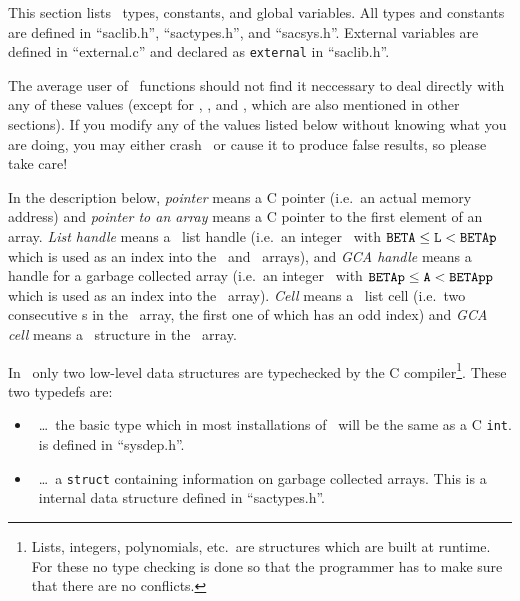 This section lists \saclib\ types, constants, and global variables. All
types and constants are defined in ``saclib.h'', ``sactypes.h'', and
``sacsys.h''. External variables are defined in ``external.c'' and declared
as {\tt external} in ``saclib.h''.

The average user of \saclib\ functions should not find it neccessary to deal
directly with any of these values (except for \Word, \BETA, and \NIL, which
are also mentioned in other sections). If you modify any of the values
listed below without knowing what you are doing, you may either crash
\saclib\ or cause it to produce false results, so please take care!

\medskip

In the description below, {\em pointer} means a C pointer (i.e.\ an actual
memory address) and {\em pointer to an array} means a C pointer to the
first element of an array. {\em List handle} means a \saclib\ list handle
(i.e.\ an integer \ttL\ with ${\tt BETA} \leq {\tt L} < {\tt BETAp}$ which is used as an
index into the \SPACEB\ and \SPACEBone\ arrays), and {\em GCA handle} means
a handle for a garbage collected array (i.e.\ an integer \ttA\ with ${\tt BETAp}
\leq {\tt A} < {\tt BETApp}$ which is used as an index into the \GCASPACEBp\
array). {\em Cell} means a \saclib\ list cell (i.e.\ two consecutive \Word s
in the \SPACE\ array, the first one of which has an odd index) and {\em GCA
cell} means a \GCArray\ structure in the \GCASPACE\ array.

\medskip

In \saclib\ only two low-level data structures are typechecked by the C
compiler\footnote{Lists, integers, polynomials, etc.\ are structures which
are built at runtime. For these no type checking is done so that the
programmer has to make sure that there are no conflicts.}. These two
typedefs are:
\begin{itemize}
\item
  \Word\ \ldots\ the basic type which in most installations of \saclib\
  will be the same as a C {\tt int}. \Word\ is defined in ``sysdep.h''.
\item
  \GCArray\ \ldots\  a {\tt struct} containing information on garbage
  collected arrays. This is a \saclib\ internal data structure defined in
  ``sactypes.h''.
\end{itemize}

